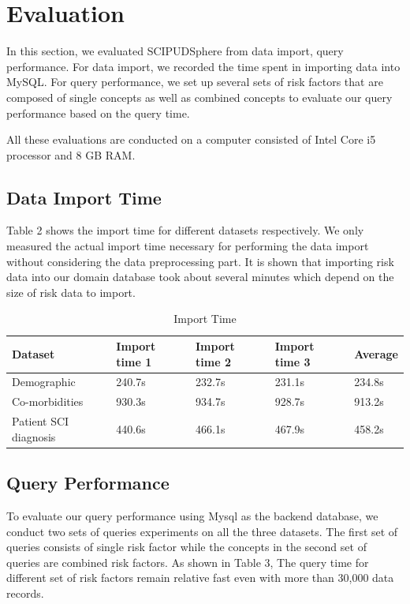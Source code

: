 \documentclass{amia}
\begin{document}
\section{Evaluation}
In this section, we evaluated SCIPUDSphere from data import, query performance. For data import, we recorded the time spent in importing data into MySQL. For query performance, we set up several sets of risk factors that are composed of single concepts as well as combined concepts to evaluate our query performance based on the query time.

All these evaluations are conducted on a computer consisted of Intel Core i5 processor and 8 GB RAM.
\subsection{Data Import Time}

Table 2 shows the import time for different datasets respectively. We only measured the actual import time necessary for performing the data import without considering the data preprocessing part. It is shown that importing risk data into our domain database took about several minutes which depend on the size of risk data to import.

\begin{table}[!ht]
\centering
\caption{Import Time}
  \begin{tabular}{|l|l|l|l|l|}
  \hline
    \textbf{Dataset}  & \textbf{Import time 1} & \textbf{Import time 2} & \textbf{Import time 3} & \textbf{Average} \\ \hline
    Demographic & 240.7s & 232.7s & 231.1s & 234.8s  \\ \hline
    Co-morbidities  & 930.3s & 934.7s & 928.7s & 913.2s  \\ \hline
    Patient SCI diagnosis  & 440.6s & 466.1s & 467.9s & 458.2s \\ \hline
  \end{tabular}
\end{table}

\subsection{Query Performance}
To evaluate our query performance using Mysql as the backend database, we conduct two sets of queries experiments on all the three datasets. The first set of queries consists of single risk factor while the concepts in the second set of queries are combined risk factors. As shown in Table 3, The query time for different set of risk factors remain relative fast even with more than 30,000 data records.
\end{document}
